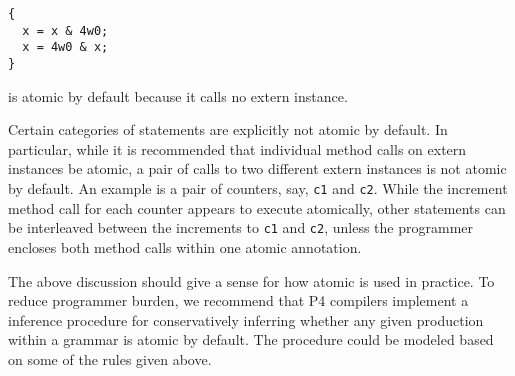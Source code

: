 \begin{verbatim}
{
  x = x & 4w0;
  x = 4w0 & x;
}
\end{verbatim}
is atomic by default because it calls no extern instance.

Certain categories of statements are explicitly not atomic by default. In
particular, while it is recommended that individual method calls on extern
instances be atomic, a pair of calls to two different extern instances is not
atomic by default. An example is a pair of counters, say, \texttt{c1} and
\texttt{c2}.  While the increment method call for each counter appears to
execute atomically, other statements can be interleaved between the increments
to \texttt{c1} and \texttt{c2}, unless the programmer encloses both method
calls within one atomic annotation.

The above discussion should give a sense for how atomic is used in practice. To
reduce programmer burden, we recommend that P4 compilers implement a inference
procedure for conservatively inferring whether any given production within a
grammar is atomic by default. The procedure could be modeled based on some of
the rules given above.
